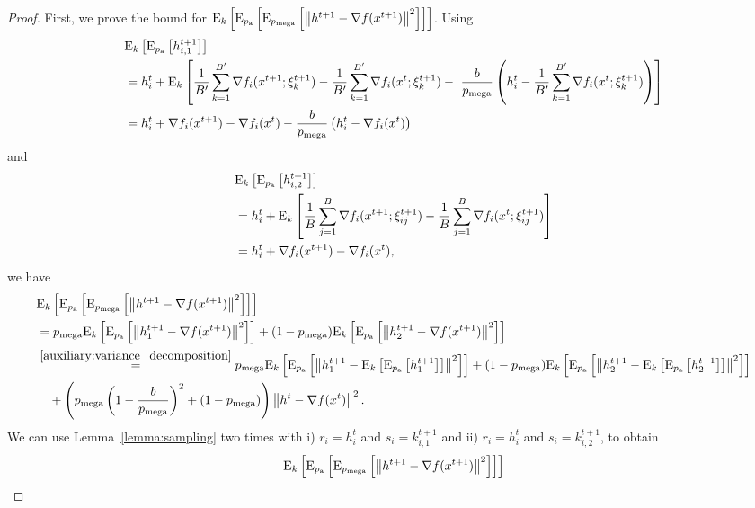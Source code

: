 \documentclass{article}
\newcommand*{\probavailable}{\ensuremath{p_{\textnormal{a}}}}
\newcommand*{\probmega}{\ensuremath{p_{\text{mega}}}}
\begin{document}
\begin{proof}
  First, we prove the bound for $\ExpSub{k}{\ExpSub{\probavailable}{\ExpSub{\probmega}{\norm{h^{t+1} - \nabla f(x^{t+1})}^2}}}$.
  Using
  \begin{align*}
    &\ExpSub{k}{\ExpSub{\probavailable}{h^{t+1}_{i,1}}} \\
    &= h^t_i + \ExpSub{k}{\frac{1}{B'} \sum_{k=1}^{B'} \nabla f_i(x^{t+1};\xi_{k}^{t+1}) - \frac{1}{B'} \sum_{k=1}^{B'} \nabla f_i(x^{t};\xi_{k}^{t+1})-~\frac{b}{\probmega}\left(h^t_i - \frac{1}{B'} \sum_{k=1}^{B'} \nabla f_i(x^{t};\xi_{k}^{t+1})\right)} \\
    &=h^t_i + \nabla f_i(x^{t+1}) - \nabla f_i(x^{t})-\frac{b}{\probmega}\left(h^t_i - \nabla f_i(x^{t})\right)
  \end{align*}
  and 
  \begin{align*}
    &\ExpSub{k}{\ExpSub{\probavailable}{h^{t+1}_{i,2}}} \\
    &= h^t_i + \ExpSub{k}{\frac{1}{B} \sum_{j=1}^{B}\nabla f_i(x^{t+1};\xi^{t+1}_{ij}) - \frac{1}{B} \sum_{j=1}^{B}\nabla f_i(x^{t};\xi^{t+1}_{ij})} \\
    &= h^t_i + \nabla f_i(x^{t+1}) - \nabla f_i(x^{t}),
  \end{align*}
  we have
  \begin{align*}
    &\ExpSub{k}{\ExpSub{\probavailable}{\ExpSub{\probmega}{\norm{h^{t+1} - \nabla f(x^{t+1})}^2}}} \\
    &=\probmega \ExpSub{k}{\ExpSub{\probavailable}{\norm{h^{t+1}_{1} - \nabla f(x^{t+1})}^2}} + (1 - \probmega) \ExpSub{k}{\ExpSub{\probavailable}{\norm{h^{t+1}_{2} - \nabla f(x^{t+1})}^2}} \\
    &\overset{\eqref{auxiliary:variance_decomposition}}{=}\probmega \ExpSub{k}{\ExpSub{\probavailable}{\norm{h^{t+1}_{1} - \ExpSub{k}{\ExpSub{\probavailable}{h^{t+1}_{1}}}}^2}} + (1 - \probmega) \ExpSub{k}{\ExpSub{\probavailable}{\norm{h^{t+1}_{2} - \ExpSub{k}{\ExpSub{\probavailable}{h^{t+1}_{2}}}}^2}} \\
    &\quad + \left(\probmega \left(1 - \frac{b}{\probmega}\right)^2 + (1 - \probmega)\right) \norm{h^{t} - \nabla f(x^{t})}^2.
  \end{align*}
  We can use Lemma~\ref{lemma:sampling} two times with i) $r_i = h^{t}_i$ and $s_i = k^{t+1}_{i, 1}$ and ii) $r_i = h^{t}_i$ and $s_i = k^{t+1}_{i, 2}$, to obtain
  \begin{align}
    &\ExpSub{k}{\ExpSub{\probavailable}{\ExpSub{\probmega}{\norm{h^{t+1} - \nabla f(x^{t+1})}^2}}} \nonumber\\

\end{align}
\end{proof}
\end{document}

